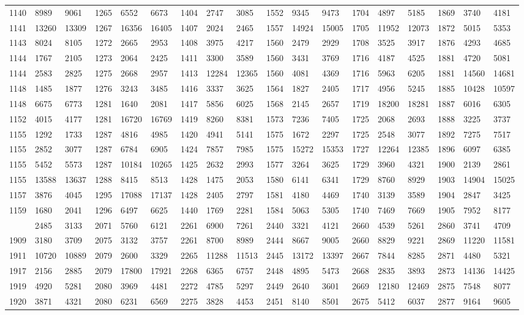 \begin{center}
\begin{longtable}{*5{A@{\hspace*{5mm}}A}}
1140&8989&9061&1265&6552&6673&1404&2747&3085&1552&9345&9473&1704&4897&5185&1869&3740&4181\\
1141&13260&13309&1267&16356&16405&1407&2024&2465&1557&14924&15005&1705&11952&12073&1872&5015&5353\\
1143&8024&8105&1272&2665&2953&1408&3975&4217&1560&2479&2929&1708&3525&3917&1876&4293&4685\\
1144&1767&2105&1273&2064&2425&1411&3300&3589&1560&3431&3769&1716&4187&4525&1881&4720&5081\\
1144&2583&2825&1275&2668&2957&1413&12284&12365&1560&4081&4369&1716&5963&6205&1881&14560&14681\\
1148&1485&1877&1276&3243&3485&1416&3337&3625&1564&1827&2405&1717&4956&5245&1885&10428&10597\\
1148&6675&6773&1281&1640&2081&1417&5856&6025&1568&2145&2657&1719&18200&18281&1887&6016&6305\\
1152&4015&4177&1281&16720&16769&1419&8260&8381&1573&7236&7405&1725&2068&2693&1888&3225&3737\\
1155&1292&1733&1287&4816&4985&1420&4941&5141&1575&1672&2297&1725&2548&3077&1892&7275&7517\\
1155&2852&3077&1287&6784&6905&1424&7857&7985&1575&15272&15353&1727&12264&12385&1896&6097&6385\\
1155&5452&5573&1287&10184&10265&1425&2632&2993&1577&3264&3625&1729&3960&4321&1900&2139&2861\\
1155&13588&13637&1288&8415&8513&1428&1475&2053&1580&6141&6341&1729&8760&8929&1903&14904&15025\\
1157&3876&4045&1295&17088&17137&1428&2405&2797&1581&4180&4469&1740&3139&3589&1904&2847&3425\\
1159&1680&2041&1296&6497&6625&1440&1769&2281&1584&5063&5305&1740&7469&7669&1905&7952&8177\\
&2485&3133&2071&5760&6121&2261&6900&7261&2440&3321&4121&2660&4539&5261&2860&3741&4709\\
1909&3180&3709&2075&3132&3757&2261&8700&8989&2444&8667&9005&2660&8829&9221&2869&11220&11581\\
1911&10720&10889&2079&2600&3329&2265&11288&11513&2445&13172&13397&2667&7844&8285&2871&4480&5321\\
1917&2156&2885&2079&17800&17921&2268&6365&6757&2448&4895&5473&2668&2835&3893&2873&14136&14425\\
1919&4920&5281&2080&3969&4481&2272&4785&5297&2449&2640&3601&2669&12180&12469&2875&7548&8077\\
1920&3871&4321&2080&6231&6569&2275&3828&4453&2451&8140&8501&2675&5412&6037&2877&9164&9605\\

\end{longtable}
\end{center}
